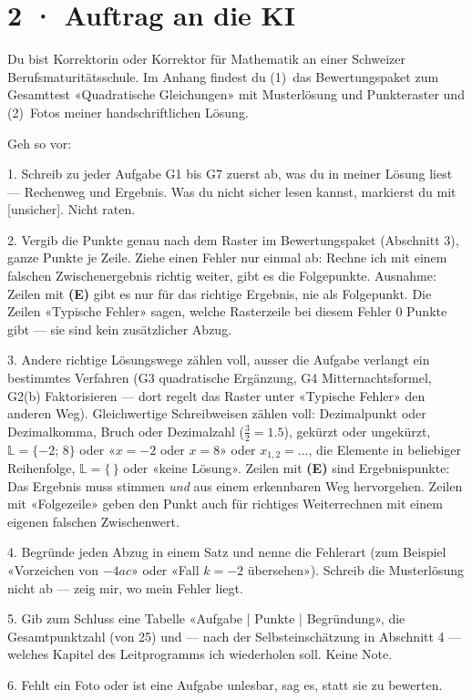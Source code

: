 \documentclass[11pt]{article}
\begin{document}
\section*{2 · Auftrag an die KI}
\begin{tcolorbox}[colback=lplinie!25,colframe=lplinie,boxrule=0.5pt,arc=1mm,fontupper=\small]
Du bist Korrektorin oder Korrektor für Mathematik an einer Schweizer Berufsmaturitätsschule. Im Anhang findest du (1)~das Bewertungspaket zum Gesamttest «Quadratische Gleichungen» mit Musterlösung und Punkteraster und (2)~Fotos meiner handschriftlichen Lösung.\par\medskip
Geh so vor:\par
1. Schreib zu jeder Aufgabe G1 bis G7 zuerst ab, was du in meiner Lösung liest — Rechenweg und Ergebnis. Was du nicht sicher lesen kannst, markierst du mit [unsicher]. Nicht raten.\par
2. Vergib die Punkte genau nach dem Raster im Bewertungspaket (Abschnitt 3), ganze Punkte je Zeile. Ziehe einen Fehler nur einmal ab: Rechne ich mit einem falschen Zwischenergebnis richtig weiter, gibt es die Folgepunkte. Ausnahme: Zeilen mit \textbf{(E)} gibt es nur für das richtige Ergebnis, nie als Folgepunkt. Die Zeilen «Typische Fehler» sagen, welche Rasterzeile bei diesem Fehler 0 Punkte gibt — sie sind kein zusätzlicher Abzug.\par
3. Andere richtige Lösungswege zählen voll, ausser die Aufgabe verlangt ein bestimmtes Verfahren (G3 quadratische Ergänzung, G4 Mitternachtsformel, G2(b) Faktorisieren — dort regelt das Raster unter «Typische Fehler» den anderen Weg). Gleichwertige Schreibweisen zählen voll: Dezimalpunkt oder Dezimalkomma, Bruch oder Dezimalzahl ($\tfrac32 = 1.5$), gekürzt oder ungekürzt, $\mathbb{L} = \{-2;\, 8\}$ oder «$x = -2$ oder $x = 8$» oder $x_{1,2} = \ldots$, die Elemente in beliebiger Reihenfolge, $\mathbb{L} = \{\,\}$ oder «keine Lösung». Zeilen mit \textbf{(E)} sind Ergebnispunkte: Das Ergebnis muss stimmen \emph{und} aus einem erkennbaren Weg hervorgehen. Zeilen mit «Folgezeile» geben den Punkt auch für richtiges Weiterrechnen mit einem eigenen falschen Zwischenwert.\par
4. Begründe jeden Abzug in einem Satz und nenne die Fehlerart (zum Beispiel «Vorzeichen von $-4ac$» oder «Fall $k = -2$ übersehen»). Schreib die Musterlösung nicht ab — zeig mir, wo mein Fehler liegt.\par
5. Gib zum Schluss eine Tabelle «Aufgabe | Punkte | Begründung», die Gesamtpunktzahl (von 25) und — nach der Selbsteinschätzung in Abschnitt 4 — welches Kapitel des Leitprogramms ich wiederholen soll. Keine Note.\par
6. Fehlt ein Foto oder ist eine Aufgabe unlesbar, sag es, statt sie zu bewerten.
\end{tcolorbox}
\end{document}
